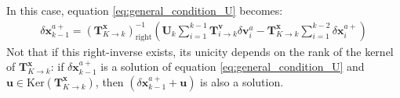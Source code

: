\documentclass[npg, manuscript]{copernicus}
\begin{document}
In this case, equation \eqref{eq:general_condition_U} becomes:
\begin{align}
\label{eq:general_condition_U_right_inverse}
\delta \mathbf{x}^{a+}_{k-1} = \left(\mathbf{T}^\mathbf{x}_{K \rightarrow k}\right)^{-1}_\text{right}  \left(\mathbf{U}_k \sum_{i=1}^{k-1} \mathbf{T}^\mathbf{v}_{i \rightarrow k} \delta \mathbf{v}^a_i - \mathbf{T}^\mathbf{x}_{K \rightarrow k} \sum_{i=1}^{k-2} \delta \mathbf{x}^{a+}_i\right)
\end{align}
Not that if this right-inverse exists, its unicity depends on the rank of the kernel of $\mathbf{T}^\mathbf{x}_{K \rightarrow k}$: if $\delta \mathbf{x}^{a+}_{k-1}$ is a solution of equation \eqref{eq:general_condition_U} and $\mathbf{u} \in \textrm{Ker}\left(\mathbf{T}^\mathbf{x}_{K \rightarrow k}\right)$, then $\left(\delta \mathbf{x}^{a+}_{k-1}+\mathbf{u}\right)$ is also a solution.
\end{document}
